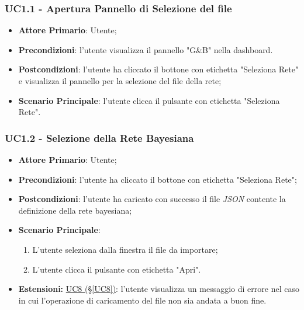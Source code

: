 \pagebreak

\subsubsection{UC1.1 - Apertura Pannello di Selezione del file}\label{UC1.1}
\begin{itemize}
	\item \textbf{Attore Primario}: Utente;
	\item \textbf{Precondizioni}: l'utente visualizza il pannello "G\&B" nella dashboard.
	\item \textbf{Postcondizioni}: l'utente ha cliccato il bottone con etichetta "Seleziona Rete" e visualizza il pannello per la selezione del file della rete;
	\item \textbf{Scenario Principale}: l'utente clicca il pulsante con etichetta "Seleziona Rete".
\end{itemize}


\subsubsection{UC1.2 - Selezione della Rete Bayesiana}\label{UC1.2}
\begin{itemize}
	\item \textbf{Attore Primario}: Utente;
	\item \textbf{Precondizioni}: l'utente ha cliccato il bottone con etichetta "Seleziona Rete";
	\item \textbf{Postcondizioni}: l'utente ha caricato con successo il file \textit{JSON} contente la definizione della rete bayesiana;
	\item \textbf{Scenario Principale}:
	\begin{enumerate}
		\item L'utente seleziona dalla finestra il file da importare;
		\item L'utente clicca il pulsante con etichetta "Apri".
	\end{enumerate}
	\item \textbf{Estensioni:} \hyperref[UC8]{UC8 (§\ref*{UC8})}: l'utente visualizza un messaggio di errore nel caso in cui l'operazione di caricamento del file non sia andata a buon fine.
\end{itemize}

\pagebreak


